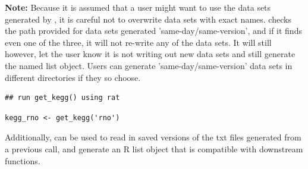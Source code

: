 \documentclass[article]{jss}\usepackage[]{graphicx}\usepackage[]{color}
\makeatletter
\newenvironment{kframe}{%
 \def\at@end@of@kframe{}%
 \ifinner\ifhmode%
  \def\at@end@of@kframe{\end{minipage}}%
  \begin{minipage}{\columnwidth}%
 \fi\fi%
 \def\FrameCommand##1{\hskip\@totalleftmargin \hskip-\fboxsep
 \colorbox{shadecolor}{##1}\hskip-\fboxsep
     \hskip-\linewidth \hskip-\@totalleftmargin \hskip\columnwidth}%
 \MakeFramed {\advance\hsize-\width
   \@totalleftmargin\z@ \linewidth\hsize
   \@setminipage}}%
 {\par\unskip\endMakeFramed%
 \at@end@of@kframe}
\newenvironment{knitrout}{}{} %
\makeatother
\begin{document}
\textbf{Note:} Because it is assumed that a user might want to use the data sets
generated by , it is careful not to overwrite data
sets with exact names.  checks the path provided
for data sets generated 'same-day/same-version', and if it finds even one of the
three, it will not re-write any of the data sets. It will still however, let the
user know it is not writing out new data sets and still generate the named list
object. Users can generate 'same-day/same-version' data sets in different
directories if they so choose.

\begin{knitrout}
\color{fgcolor}\begin{kframe}
\begin{lstlisting}[basicstyle=\ttfamily,breaklines=true]
## run get_kegg() using rat\end{lstlisting}
\begin{lstlisting}[basicstyle=\ttfamily,breaklines=true]
kegg_rno <- get_kegg('rno')\end{lstlisting}


{\ttfamily\noindent\itshape\color{messagecolor}{\#\# These files already exist in your working directory. New files will not be generated.}}

{\ttfamily\noindent\itshape\color{messagecolor}{\#\# Kegg Release: Release\_94.0+\_04-06\_Apr\_20}}\end{kframe}
\end{knitrout}

Additionally,  can be used to read in saved
versions of the txt files generated from a previous call, and generate an R list
object that is compatible with downstream functions.
\end{document}
